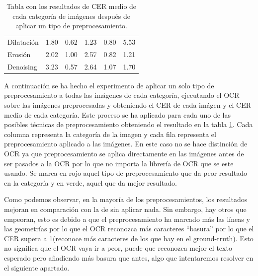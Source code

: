 \begin{enumerate}
\begin{table}[H]
\begin{tabular}{llllll}
			Dilatación                                                           & \cellcolor[HTML]{00FF00}1.80  & 0.62                         & \cellcolor[HTML]{00FF00}1.23  & 0.80                         & 5.53                          \\
			Erosión                                                              & 2.02                          & 1.00                         & 2.57                          & 0.82                         & 1.21                          \\
			Denoising                                                            & 3.23                          & 0.57                         & 2.64                          & 1.07                         & 1.70                         
		\end{tabular}
		\caption{Tabla con los resultados de CER medio de cada categoría de imágenes después de aplicar un tipo de preprocesamiento.}
		\label{table:preproCERtable}
	\end{table}
\end{enumerate}
A continuación se ha hecho el experimento de aplicar un solo tipo de preprocesamiento a todas las imágenes de cada categoría, ejecutando el OCR sobre las imágenes preprocesadas y obteniendo el CER de cada imágen y el CER medio de cada categoría. Este proceso se ha aplicado para cada uno de las posibles técnicas de preprocesamiento obteniendo el resultado en la tabla \ref{table:preproCERtable}. Cada columna representa la categoría de la imagen y cada fila representa el preprocesamiento aplicado a las imágenes. En este caso no se hace distinción de OCR ya que preprocesamiento se aplica directamente en las imágenes antes de ser pasados a la OCR por lo que no importa la librería de OCR que se este usando.
Se marca en rojo aquel tipo de preprocesamiento que da peor resultado en la categoría y en verde, aquel que da mejor resultado.


Como podemos observar, en la mayoría de los preprocesamientos, los resultados mejoran en comparación con la de sin aplicar nada. Sin embargo, hay otros que empeoran, esto es debido a que el preprocesamiento ha marcado más las líneas y las geometrías por lo que el OCR reconozca más caracteres ``basura'' por lo que el CER supera a 1(reconoce más caracteres de los que hay en el ground-truth). Esto no significa que el OCR vaya ir a peor, puede que reconozca mejor el texto esperado pero añadiendo más basura que antes, algo que intentaremos resolver en el siguiente apartado. 


